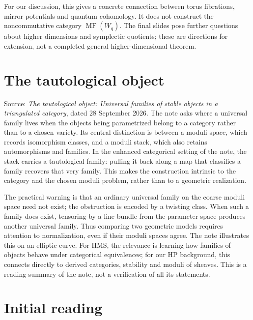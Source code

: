 \medskip\noindent
For our discussion, this gives a concrete
connection between torus fibrations,
mirror potentials and quantum cohomology.
It does not construct the
noncommutative category
$\operatorname{MF}(W_q)$.
The final slides pose further questions
about higher dimensions and symplectic
quotients; these are directions for
extension, not a completed general
higher-dimensional theorem.


\section{The tautological object}
\label{section-tautological-object}

\noindent
Source: \textit{The tautological object:
Universal families of stable objects
in a triangulated category},
dated 28 September 2026.
The note asks where a universal family
lives when the objects being parametrized
belong to a category rather than to a
chosen variety. Its central distinction
is between a moduli space, which records
isomorphism classes, and a moduli stack,
which also retains automorphisms and
families. In the enhanced categorical
setting of the note, the stack carries
a tautological family: pulling it back
along a map that classifies a family
recovers that very family. This makes
the construction intrinsic to the
category and the chosen moduli problem,
rather than to a geometric realization.

\medskip\noindent
The practical warning is that an ordinary
universal family on the coarse moduli
space need not exist; the obstruction
is encoded by a twisting class.
When such a family does exist, tensoring
by a line bundle from the parameter
space produces another universal family.
Thus comparing two geometric models
requires attention to normalization,
even if their moduli spaces agree.
The note illustrates this on an elliptic
curve. For HMS, the relevance is learning
how families of objects behave under
categorical equivalences; for our HP
background, this connects directly to
derived categories, stability and moduli
of sheaves. This is a reading summary
of the note, not a verification
of all its statements.

\section{Initial reading}
\label{section-initial-reading}

